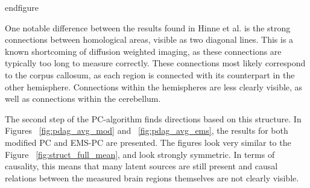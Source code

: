 \documentclass[a4paper, 10pt, english, onecolumn]{article}
\begin{document}
end{figure}


One notable difference between the results found in Hinne et al. is the strong connections between homological areas, visible as two diagonal lines.
This is a known shortcoming of diffusion weighted imaging, as these connections are typically too long to measure correctly.
These connections most likely correspond to the corpus callosum, as each region is connected with its counterpart in the other hemisphere.
Connections within the hemispheres are less clearly visible, as well as connections within the cerebellum.

The second step of the PC-algorithm finds directions based on this structure.
In Figures ~\ref{fig:pdag_avg_mod} and ~\ref{fig:pdag_avg_ems}, the results for both modified PC and EMS-PC are presented.
The figures look very similar to the Figure ~\ref{fig:struct_full_mean}, and look strongly symmetric.
In terms of causality, this means that many latent sources are still present and causal relations between the measured brain regions themselves are not clearly visible.
\end{document}
